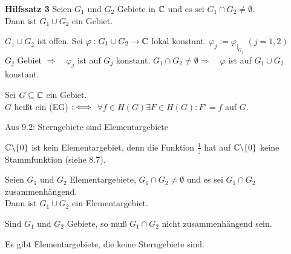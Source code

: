\documentclass[a4paper,twoside,DIV15,BCOR12mm]{scrbook}
\def\gdw{\equizu}
\def\gdw{\equizu}
\begin{document}
\textbf{Hilfssatz 3}
Seien $G_1$ und $G_2$ Gebiete in $\mathbb{C}$ und es sei $G_1 \cap G_2 \neq \emptyset$.  \\
Dann ist $G_1 \cup G_2$ ein Gebiet.

\begin{beweis}
$G_1 \cup G_2$ ist offen. Sei $\varphi: G_1 \cup G_2 \to \mathbb{C}$ lokal konstant.
$\varphi_j := \varphi_{|_{G_j}}$ $(j = 1,2)$ \\
$G_j$ Gebiet $\Rightarrow \quad \varphi_j $ ist auf $G_j$ konstant. $G_1 \cap G_2
\neq \emptyset \Rightarrow \quad \varphi$ ist auf $G_1 \cup G_2$ konstant.
\end{beweis}

\begin{definition}
Sei $G \subseteq \mathbb{C}$ ein Gebiet. \\$G$ heißt ein  (EG)
$:\gdw$ $\forall f \in H(G) \exists F \in H(G) : F' = f$ auf $G$.
\end{definition}

\begin{beispiel}
\begin{liste}
\item Aus 9.2: Sterngebiete sind Elementargebiete
\item $\mathbb{C} \backslash \{0\}$ ist kein Elementargebiet, denn die Funktion
$\frac{1}{z}$ hat auf $\mathbb{C} \backslash \{0\} $ keine Stammfunktion (siehe 8.7).
\end{liste}
\end{beispiel}

\begin{satz}
Seien $G_1$ und $G_2$ Elementargebiete, $G_1\cap G_2 \neq \emptyset$ und es sei
$G_1 \cap G_2$ zusammenhängend. \\
Dann ist $G_1 \cup G_2$ ein Elementargebiet.
\end{satz}

\begin{bemerkung}
 
\begin{liste}
\item Sind $G_1$ und $G_2$ Gebiete, so muß $G_1 \cap G_2$ nicht zusammenhängend
sein. 
\item Es gibt Elementargebiete, die keine Sterngebiete sind.
\end{liste}
\end{bemerkung}
\end{document}
